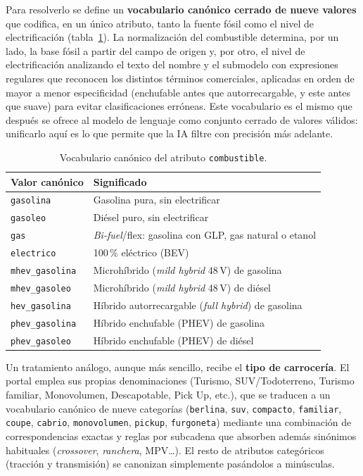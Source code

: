 Para resolverlo se define un \textbf{vocabulario canónico cerrado de nueve
valores} que codifica, en un único atributo, tanto la fuente fósil como el nivel
de electrificación (tabla~\ref{tab:vocab-combustible}). La normalización del
combustible determina, por un lado, la base fósil a partir del campo de origen y,
por otro, el nivel de electrificación analizando el texto del nombre y el
submodelo con expresiones regulares que reconocen los distintos términos
comerciales, aplicadas en orden de mayor a menor especificidad (enchufable antes
que autorrecargable, y este antes que suave) para evitar clasificaciones
erróneas. Este vocabulario es el mismo que después se ofrece al modelo de
lenguaje como conjunto cerrado de valores válidos: unificarlo aquí es lo que
permite que la IA filtre con precisión más adelante.

\begin{table}[H]
\centering
\begin{tabular}{p{3.5cm}p{9cm}}
\hline
\textbf{Valor canónico} & \textbf{Significado} \\
\hline
\texttt{gasolina}      & Gasolina pura, sin electrificar \\
\texttt{gasoleo}       & Diésel puro, sin electrificar \\
\texttt{gas}           & \emph{Bi-fuel}/flex: gasolina con GLP, gas natural o etanol \\
\texttt{electrico}     & 100\,\% eléctrico (BEV) \\
\texttt{mhev\_gasolina} & Microhíbrido (\emph{mild hybrid} 48\,V) de gasolina \\
\texttt{mhev\_gasoleo}  & Microhíbrido (\emph{mild hybrid} 48\,V) de diésel \\
\texttt{hev\_gasolina}  & Híbrido autorrecargable (\emph{full hybrid}) de gasolina \\
\texttt{phev\_gasolina} & Híbrido enchufable (PHEV) de gasolina \\
\texttt{phev\_gasoleo}  & Híbrido enchufable (PHEV) de diésel \\
\hline
\end{tabular}
\caption{Vocabulario canónico del atributo \texttt{combustible}.}
\label{tab:vocab-combustible}
\end{table}

Un tratamiento análogo, aunque más sencillo, recibe el \textbf{tipo de
carrocería}. El portal emplea sus propias denominaciones (Turismo, SUV/Todoterreno,
Turismo familiar, Monovolumen, Descapotable, Pick Up, etc.), que se traducen a un
vocabulario canónico de nueve categorías (\texttt{berlina}, \texttt{suv},
\texttt{compacto}, \texttt{familiar}, \texttt{coupe}, \texttt{cabrio},
\texttt{monovolumen}, \texttt{pickup}, \texttt{furgoneta}) mediante una
combinación de correspondencias exactas y reglas por subcadena que absorben
además sinónimos habituales (\emph{crossover}, \emph{ranchera}, MPV…). El resto
de atributos categóricos (tracción y transmisión) se canonizan simplemente
pasándolos a minúsculas.

